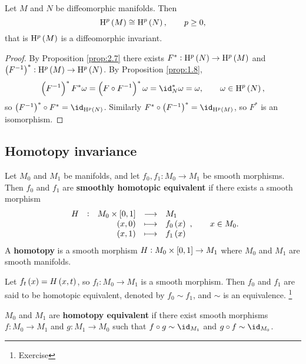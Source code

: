 \begin{corollary}
Let $ M $ and $ N $ be diffeomorphic manifolds. Then
$$ \H^p\br{M} \cong \H^p\br{N}, \qquad p \ge 0, $$
that is $ \H^p\br{M} $ is a diffeomorphic invariant.
\end{corollary}

\begin{proof}
By Proposition \ref{prop:2.7} there exists $ F^* : \H^p\br{N} \to \H^p\br{M} $ and $ \br{F^{-1}}^* : \H^p\br{M} \to \H^p\br{N} $. By Proposition \ref{prop:1.8},
$$ \br{F^{-1}}^*F^*\omega = \br{F \circ F^{-1}}^*\omega = \id_N^*\omega = \omega, \qquad \omega \in \H^p\br{N}, $$
so $ \br{F^{-1}}^* \circ F^* = \id_{\H^p\br{N}} $. Similarly $ F^* \circ \br{F^{-1}}^* = \id_{\H^p\br{M}} $, so $ F^* $ is an isomorphism.
\end{proof}

\subsection{Homotopy invariance}

\begin{definition}
Let $ M_0 $ and $ M_1 $ be manifolds, and let $ f_0, f_1 : M_0 \to M_1 $ be smooth morphisms. Then $ f_0 $ and $ f_1 $ are \textbf{smoothly homotopic equivalent} if there exists a smooth morphism
$$ \functions[H]{M_0 \times \sbr{0, 1}}{M_1}{\br{x, 0}}{f_0\br{x}}{\br{x, 1}}{f_1\br{x}}, \qquad x \in M_0. $$
A \textbf{homotopy} is a smooth morphism $ H : M_0 \times \sbr{0, 1} \to M_1 $ where $ M_0 $ and $ M_1 $ are smooth manifolds.
\end{definition}


\begin{notation}
Let $ f_t\br{x} = H\br{x, t} $, so $ f_t : M_0 \to M_1 $ is a smooth morphism. Then $ f_0 $ and $ f_1 $ are said to be homotopic equivalent, denoted by $ f_0 \sim f_1 $, and $ \sim $ is an equivalence. \footnote{Exercise}
\end{notation}

\begin{definition}
$ M_0 $ and $ M_1 $ are \textbf{homotopy equivalent} if there exist smooth morphisms $ f : M_0 \to M_1 $ and $ g : M_1 \to M_0 $ such that $ f \circ g \sim \id_{M_1} $ and $ g \circ f \sim \id_{M_0} $.
\end{definition}

